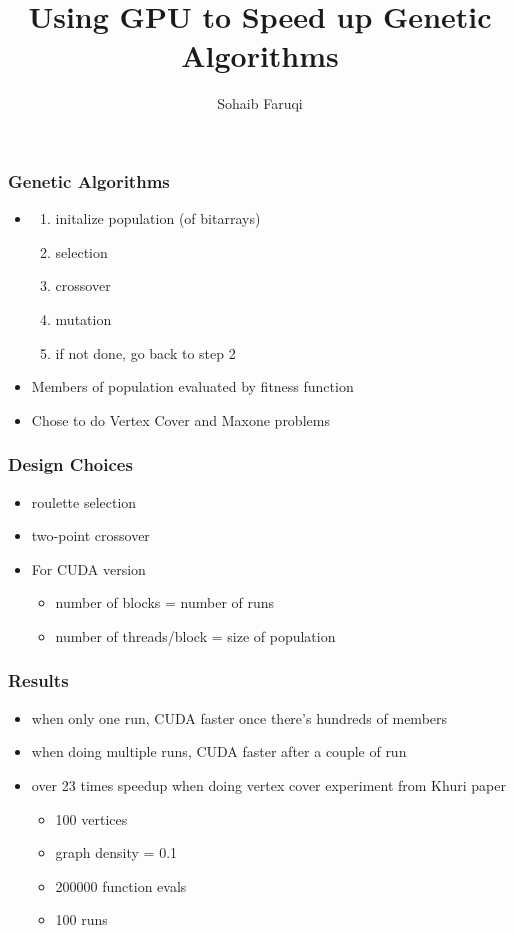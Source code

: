 \documentclass{beamer}
\title{Using GPU to Speed up Genetic Algorithms}
\author{Sohaib Faruqi}
\begin{document}
	\frame{\titlepage}
	\begin{frame}
		\frametitle{Genetic Algorithms}
		\begin{itemize}
		\item
		\begin{enumerate}
			\item initalize population (of bitarrays)
			\item selection
			\item crossover
			\item mutation
			\item if not done, go back to step 2
		\end{enumerate}
		\item Members of population evaluated by fitness function
		\item Chose to do Vertex Cover and Maxone problems
		\end{itemize}
	\end{frame}
	\begin{frame}
		\frametitle{Design Choices}
		\begin{itemize}
			\item roulette selection
			\item two-point crossover
			\item For CUDA version
			\begin{itemize}
				\item number of blocks = number of runs
				\item number of threads/block = size of population
			\end{itemize}
		\end{itemize}
	\end{frame}
	\begin{frame}
		\frametitle{Results}
		\begin{itemize}
		\item when only one run, CUDA faster once there's hundreds of members
		\item when doing multiple runs, CUDA faster after a couple of run
		\item over 23 times speedup when doing vertex cover experiment from Khuri paper
			\begin{itemize}
				\item 100 vertices
				\item graph density = 0.1
				\item 200000 function evals
				\item 100 runs
			\end{itemize}
		\end{itemize}
	\end{frame}
\end{document}
